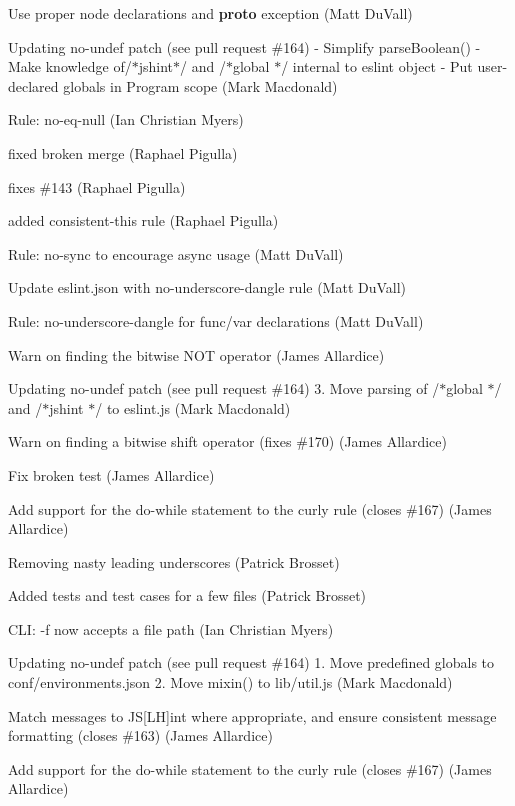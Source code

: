 \begin{DoxyItemize}
\item Use proper node declarations and {\bfseries proto} exception (Matt Du\+Vall)
\item Updating no-\/undef patch (see pull request \#164) -\/ Simplify parse\+Boolean() -\/ Make knowledge of{\ttfamily /$\ast$jshint$\ast$/} and {\ttfamily /$\ast$global $\ast$/} internal to eslint object -\/ Put user-\/declared globals in Program scope (Mark Macdonald)
\item Rule\+: no-\/eq-\/null (Ian Christian Myers)
\item fixed broken merge (Raphael Pigulla)
\item fixes \#143 (Raphael Pigulla)
\item added consistent-\/this rule (Raphael Pigulla)
\item Rule\+: no-\/sync to encourage async usage (Matt Du\+Vall)
\item Update eslint.\+json with no-\/underscore-\/dangle rule (Matt Du\+Vall)
\item Rule\+: no-\/underscore-\/dangle for func/var declarations (Matt Du\+Vall)
\item Warn on finding the bitwise N\+OT operator (James Allardice)
\item Updating no-\/undef patch (see pull request \#164) 3. Move parsing of {\ttfamily /$\ast$global $\ast$/} and {\ttfamily /$\ast$jshint $\ast$/} to eslint.\+js (Mark Macdonald)
\item Warn on finding a bitwise shift operator (fixes \#170) (James Allardice)
\item Fix broken test (James Allardice)
\item Add support for the do-\/while statement to the curly rule (closes \#167) (James Allardice)
\item Removing nasty leading underscores (Patrick Brosset)
\item Added tests and test cases for a few files (Patrick Brosset)
\item C\+LI\+: -\/f now accepts a file path (Ian Christian Myers)
\item Updating no-\/undef patch (see pull request \#164) 1. Move predefined globals to {\ttfamily conf/environments.\+json} 2. Move mixin() to {\ttfamily lib/util.\+js} (Mark Macdonald)
\item Match messages to JS\mbox{[}LH\mbox{]}int where appropriate, and ensure consistent message formatting (closes \#163) (James Allardice)
\item Add support for the do-\/while statement to the curly rule (closes \#167) (James Allardice)

\end{DoxyItemize}

